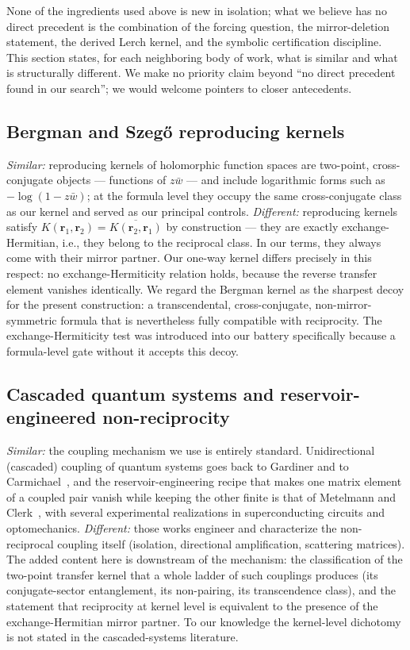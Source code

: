 \documentclass[11pt,a4paper]{article}
\newcommand{\wb}{\bar{w}}
\begin{document}
None of the ingredients used above is new in isolation; what we believe has no
direct precedent is the combination of the forcing question, the mirror-deletion
statement, the derived Lerch kernel, and the symbolic certification discipline.
This section states, for each neighboring body of work, what is similar and what
is structurally different. We make no priority claim beyond ``no direct precedent
found in our search''; we would welcome pointers to closer antecedents.

\subsection{Bergman and Szeg\H{o} reproducing kernels}

\emph{Similar:} reproducing kernels of holomorphic function spaces are two-point,
cross-conjugate objects --- functions of $z\wb$ --- and include logarithmic forms
such as $-\log(1 - z\wb)$; at the formula level they occupy the same
cross-conjugate class as our kernel and served as our principal controls.
\emph{Different:} reproducing kernels satisfy
$K(\mathbf{r}_1, \mathbf{r}_2) = \overline{K(\mathbf{r}_2, \mathbf{r}_1)}$ by
construction --- they are exactly exchange-Hermitian, i.e., they belong to the
reciprocal class. In our terms, they always come with their mirror partner. Our
one-way kernel differs precisely in this respect: no exchange-Hermiticity
relation holds, because the reverse transfer element vanishes identically. We
regard the Bergman kernel as the sharpest decoy for the present construction: a
transcendental, cross-conjugate, non-mirror-symmetric formula that is
nevertheless fully compatible with reciprocity. The exchange-Hermiticity test
was introduced into our battery specifically because a formula-level gate
without it accepts this decoy.

\subsection{Cascaded quantum systems and reservoir-engineered non-reciprocity}

\emph{Similar:} the coupling mechanism we use is entirely standard.
Unidirectional (cascaded) coupling of quantum systems goes back to Gardiner and
to Carmichael~\cite{Gardiner1993,Carmichael1993}, and the reservoir-engineering
recipe that makes one matrix element of a coupled pair vanish while keeping the
other finite is that of Metelmann and Clerk~\cite{MetelmannClerk2015}, with
several experimental realizations in superconducting circuits and
optomechanics. \emph{Different:} those works engineer and characterize the
non-reciprocal coupling itself (isolation, directional amplification,
scattering matrices). The added content here is downstream of the mechanism:
the classification of the two-point transfer kernel that a whole ladder of such
couplings produces (its conjugate-sector entanglement, its non-pairing, its
transcendence class), and the statement that reciprocity at kernel level is
equivalent to the presence of the exchange-Hermitian mirror partner. To our
knowledge the kernel-level dichotomy is not stated in the cascaded-systems
literature.
\end{document}
